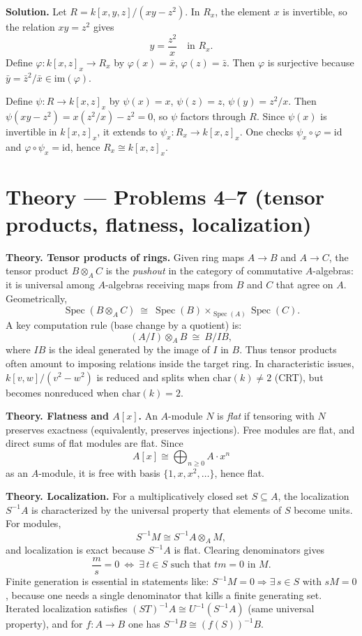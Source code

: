 \documentclass[12pt,a4paper]{article}
\DeclareMathOperator{\Spec}{Spec}
\theoremstyle{plain}
\theoremstyle{definition}      %
\begin{document}
	\textbf{Solution.}
	Let \(R=k[x,y,z]/(xy-z^2)\). In \(R_x\), the element \(x\) is invertible, so the relation \(xy=z^2\) gives
	\[
	y=\frac{z^2}{x}\quad \text{in }R_x.
	\]
	Define \(\varphi:k[x,z]_x\to R_x\) by \(\varphi(x)=\bar x\), \(\varphi(z)=\bar z\). Then \(\varphi\) is surjective because
	\(\bar y=\bar z^2/\bar x\in \mathrm{im}(\varphi)\).
	
	Define \(\psi:R\to k[x,z]_x\) by \(\psi(x)=x\), \(\psi(z)=z\), \(\psi(y)=z^2/x\).
	Then \(\psi(xy-z^2)=x(z^2/x)-z^2=0\), so \(\psi\) factors through \(R\). Since \(\psi(x)\) is invertible in \(k[x,z]_x\),
	it extends to \(\psi_x:R_x\to k[x,z]_x\). One checks \(\psi_x\circ\varphi=\mathrm{id}\) and \(\varphi\circ\psi_x=\mathrm{id}\),
	hence \(R_x\cong k[x,z]_x\).
	
	\section*{Theory — Problems 4--7 (tensor products, flatness, localization)}
	
	\textbf{Theory. Tensor products of rings.}
	Given ring maps \(A\to B\) and \(A\to C\), the tensor product \(B\otimes_A C\) is the \emph{pushout}
	in the category of commutative \(A\)-algebras: it is universal among \(A\)-algebras receiving maps from
	\(B\) and \(C\) that agree on \(A\). Geometrically,
	\[
	\Spec(B\otimes_A C)\ \cong\ \Spec(B)\times_{\Spec(A)}\Spec(C).
	\]
	A key computation rule (base change by a quotient) is:
	\[
	(A/I)\otimes_A B \ \cong\ B/IB,
	\]
	where \(IB\) is the ideal generated by the image of \(I\) in \(B\). Thus tensor products often amount to
	imposing relations inside the target ring. In characteristic issues, \(k[v,w]/(v^2-w^2)\) is reduced and splits
	when \(\mathrm{char}(k)\neq 2\) (CRT), but becomes nonreduced when \(\mathrm{char}(k)=2\).
	
	\medskip
	\textbf{Theory. Flatness and \(A[x]\).}
	An \(A\)-module \(N\) is \emph{flat} if tensoring with \(N\) preserves exactness (equivalently, preserves injections).
	Free modules are flat, and direct sums of flat modules are flat. Since
	\[
	A[x]\cong \bigoplus_{n\ge 0} A\cdot x^n
	\]
	as an \(A\)-module, it is free with basis \(\{1,x,x^2,\dots\}\), hence flat.
	
	\medskip
	\textbf{Theory. Localization.}
	For a multiplicatively closed set \(S\subseteq A\), the localization \(S^{-1}A\) is characterized by the universal
	property that elements of \(S\) become units. For modules,
	\[
	S^{-1}M \cong S^{-1}A\otimes_A M,
	\]
	and localization is exact because \(S^{-1}A\) is flat. Clearing denominators gives
	\[
	\frac{m}{s}=0 \ \Longleftrightarrow\ \exists\,t\in S\text{ such that } tm=0 \text{ in }M.
	\]
	Finite generation is essential in statements like: \(S^{-1}M=0\Rightarrow \exists\,s\in S \text{ with } sM=0\),
	because one needs a single denominator that kills a finite generating set.
	Iterated localization satisfies \((ST)^{-1}A \cong U^{-1}(S^{-1}A)\) (same universal property),
	and for \(f:A\to B\) one has \(S^{-1}B\cong (f(S))^{-1}B\).
	
\end{document}
